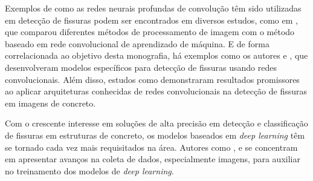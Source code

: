 Exemplos de como as redes neurais profundas de convolução têm sido utilizadas em detecção de fissuras podem ser encontrados em diversos estudos, como em , que comparou diferentes métodos de processamento de imagem com o método baseado em rede convolucional de aprendizado de máquina.
E de forma correlacionada ao objetivo desta monografia, há exemplos como os autores  e , que desenvolveram modelos específicos para detecção de fissuras usando redes convolucionais. 
Além disso, estudos como  demonstraram resultados promissores ao aplicar arquiteturas conhecidas de redes convolucionais na detecção de fissuras em imagens de concreto.

Com o crescente interesse em soluções de alta precisão em detecção e classificação de fissuras em estruturas de concreto, os modelos baseados em \textit{deep learning} têm se tornado cada vez mais requisitados na área. Autores como ,  e  se concentram em apresentar avanços na coleta de dados, especialmente imagens, para auxiliar no treinamento dos modelos de \textit{deep learning}.

